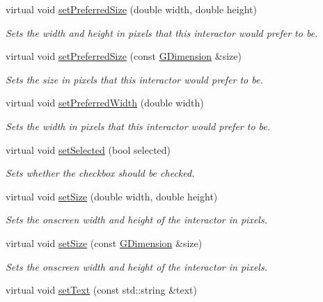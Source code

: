 \begin{DoxyCompactItemize}
virtual void \mbox{\hyperlink{classGInteractor_a042c5ae19430d765ef552371cae3632c}{set\+Preferred\+Size}} (double width, double height)
\begin{DoxyCompactList}\small\item\em Sets the width and height in pixels that this interactor would prefer to be. \end{DoxyCompactList}\item 
virtual void \mbox{\hyperlink{classGInteractor_aa22d9be4bc0e078bb0ea69b0fc9d7c75}{set\+Preferred\+Size}} (const \mbox{\hyperlink{structGDimension}{G\+Dimension}} \&size)
\begin{DoxyCompactList}\small\item\em Sets the size in pixels that this interactor would prefer to be. \end{DoxyCompactList}\item 
virtual void \mbox{\hyperlink{classGInteractor_a3db429ab2fa52efd187eec0ed8cdd9f2}{set\+Preferred\+Width}} (double width)
\begin{DoxyCompactList}\small\item\em Sets the width in pixels that this interactor would prefer to be. \end{DoxyCompactList}\item 
virtual void \mbox{\hyperlink{classGCheckBox_ad42accd39af295a957386c68dac3dcae}{set\+Selected}} (bool selected)
\begin{DoxyCompactList}\small\item\em Sets whether the checkbox should be checked. \end{DoxyCompactList}\item 
virtual void \mbox{\hyperlink{classGInteractor_aca25d49481f9bf5fc8f7df4c086c4ce7}{set\+Size}} (double width, double height)
\begin{DoxyCompactList}\small\item\em Sets the onscreen width and height of the interactor in pixels. \end{DoxyCompactList}\item 
virtual void \mbox{\hyperlink{classGInteractor_ae2b628228f192c2702c4ce941b2af68f}{set\+Size}} (const \mbox{\hyperlink{structGDimension}{G\+Dimension}} \&size)
\begin{DoxyCompactList}\small\item\em Sets the onscreen width and height of the interactor in pixels. \end{DoxyCompactList}\item 
virtual void \mbox{\hyperlink{classGCheckBox_ac1ae51949d41ee9054634be5967d91b8}{set\+Text}} (const std\+::string \&text)

\end{DoxyCompactItemize}
